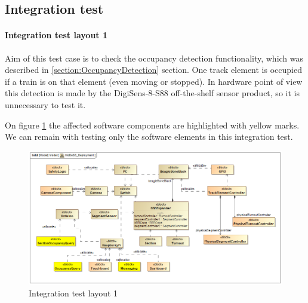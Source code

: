 
\subsection{Integration test}
\paragraph{Integration test layout 1}
Aim of this test case is to check the occupancy detection functionality, which was described in \ref{section:OccupancyDetection} section. One track element is occupied if a train is on that element (even moving or stopped). In hardware point of view this detection is made by the DigiSens-8-S88 off-the-shelf sensor product, so it is unnecessary to test it.

On figure \ref{fig:MoDeS3_Deployment-test1} the affected software components are highlighted with yellow marks. We can remain with testing only the software elements in this integration test.
\begin{figure}[!h]
	\centering
	\includegraphics[width=150mm, keepaspectratio]{figures/testDesign/testLayoutSYSML/MoDeS3_Deployment-test1.png}
	\caption{Integration test layout 1}
	\label{fig:MoDeS3_Deployment-test1}
\end{figure}

